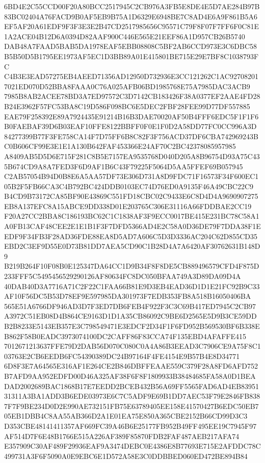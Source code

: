 \documentclass[UTF8,fontset=fandol,zihao=-4,a4paper]{ctexart}
\begin{document}
{{6BD4E2C55CCD00F20A80BCC2517945C2CB976A3FB5E8DE4E5D7AE284B97B83BC02404A76FACD9B0AF5EB9B75A1D6329E6948BE7C8AD4E6A9F861B5A6
EF5AF20A61EDF9F3F3E3E2B47CD2517985656C95571C79F8F07F7FF6F0C81E1A2ACE04B12D6A0394D82AAF900C446E565E21EEF86A1D957CB26B5740
DAB48A7FAAD5BAB5DA1978EAF5EBB08808C5BF2AB6CCD973E3C6DBC58B5B50D5B1795EE1973AF5EC1D3BB89A01E415801BE715E29E7BF8C1038793FC
C4B3E3EAD57275EB4AEED71356AD12950D732936E3CC121262C1AC927082017021ED070D52BBA8FAAA0C76A025AFB06BD1985768E75A7985DAC3ACB9
7985B8AB2ACEE78BD3A7ED97572C3D7142CB183426F38A0377EF2AAE4FD28B24E3962F57FC53BA8C19D586F098BC6E5DEC2FBF28FEE99D77DF557885
EAE79F258392E89A7924435E91214B16B3DAE70020AF50B4FFF6EDC5F1F1F6B0FAEBAF39D6B03EAF10FFE8122BBFF0F0E1F0D2A58DD77FC0CC996A3D
84277399B77F3FE758CA14F7D75FF6B8C82F3F756ACD37DF6CBA742969243BC0B606CF99E3E1E1A130B642FAF453366E24AF70C2BC42378085957985
A8409AB5D5D6E715F281C8B5E7157EA9535768D040D205A8B96754D93A75C435B674CD9A8A7FED3F6D9AF1B6C43F79225F5064D5AA5FFEF69B057945
C2AB57054B94D0B8E6A5AA57DF73E306D731A8D9FDC71F16573F34F600EC105B2F5FB66CA3C4B792BC424DDB0103EC74D76ED0A9135F46A49CBC22C9
B4CD9B73172CA85BF90E43869C551FD18CBC02C9433E6C8D4D4A9690907275EB8A137EFC8A15ABCE9DD338D01E203765C306E31116A66FDDBAE2CC19
F20A27CC2BBA8C186193BC62C1C1838AF3F9ECC0017BE415E231BC78C58A1A0FB13CAF48CEE2E1E1B1F3F7DFD5366AD4E2C58A0D36DE79F7DDA38F1E
EDF9F34FB3F28AD36FDE88EA8D5AD7A606C5D3D3336AC204C62D855CD35EBD2C3EF9D55E0D73B81DD7AEA5CD90C1B28D4A7A6420AF30762631B148D9
B219B264F10F08B0E125347DA64CC1D9B34F8F8DE5CB889496579CFD4F875D233FFF5C5495456529290126AF80634FC8DC050BFAA749A3D89DA09D4A
40DAB40D3A7716A71C2F22C1FAA66B81E9D3EB4EAD36D1D1E21FC92B9C33AF10F56DC5B53D78EF9E597985DA301973F7EDB353FB8A518B16050406BA
565E51A6766DF946AD3D7F3ED7DB6FEB4F922F3C3C69B417ED7945C2CB97A3972C51EB08D4B864CE9163D1D1A35CB86092C9BE6D2565E5D9B3CE59DD
B2B8233E5143EB357E3C798549471E3EDCF2D34F1F6FD952B569530BF6B338EB862F58B0EADC3973074100DC2CAFF86F83CCA74F135EBD4AFAFFE415
7012671213637FFE79D2DAB56D070C080C0A4A86B3EEAD3C7906CE9A75F8C103763E2CB6EEDB6FC54390389DC24B97164F4FE4154E9B57B4E8D34771
6D8F3E7A64565E316AF1E264CE2B846DBFFEAAE559C379F28A8FD6AFD752B7AFD9AA952EDFD00D46A325AF38F6F8F1809933B38484685FA58A0D1BEA
DAD2002689BAC1868B17E7EEDD2BCEB432B56A69FF5565FAD6AD4EB8395131311A3BA1ADD3B6EDE03973E6C7C5ADF9E69B1DD7AEC53F79E2846FB838
7F7F9BE234D0D2E990AE732151FB75E63789405EE158E41570427B6EDC50EB705EB1DBB4C8AA55AB366D2A1E01EA75E850A365CBE2152B66CD99D3C3
D353CBE48141411357AF669FC39A46B6E25177FB952B49FF495EE19C7945F97AF514D7F6E48B1766E515A226AF389F85870FDB2FAF487AEB217AFA74
E357909C30AF489F29936EAF9A3474DEBC0E4386E8B77693E715E2AFDDC78C499731A3F6F5090A0E9EBC6E1D572A58E3C0DDBBED060ED472BE894B84
}}
\end{document}
